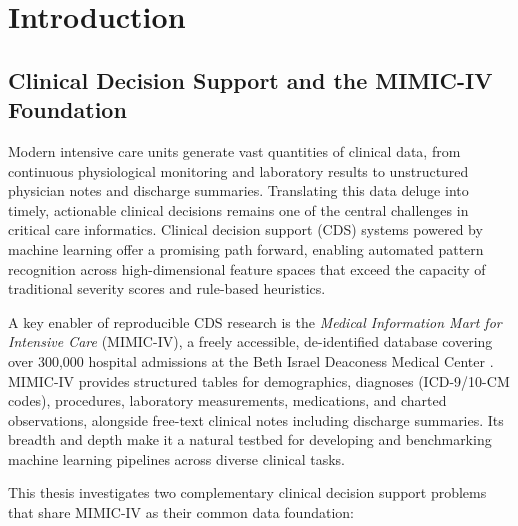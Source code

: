 \chapter{Introduction} \label{chap:intro}

\section{Clinical Decision Support and the MIMIC-IV Foundation}
\label{sec:cds_mimic_foundation}

Modern intensive care units generate vast quantities of clinical data, from continuous physiological monitoring and laboratory results to unstructured physician notes and discharge summaries. Translating this data deluge into timely, actionable clinical decisions remains one of the central challenges in critical care informatics. Clinical decision support (CDS) systems powered by machine learning offer a promising path forward, enabling automated pattern recognition across high-dimensional feature spaces that exceed the capacity of traditional severity scores and rule-based heuristics.

A key enabler of reproducible CDS research is the \emph{Medical Information Mart for Intensive Care} (MIMIC-IV), a freely accessible, de-identified database covering over 300,000 hospital admissions at the Beth Israel Deaconess Medical Center \citep{Johnson_2023_MIMIC,johnson2023mimicivscidata}. MIMIC-IV provides structured tables for demographics, diagnoses (ICD-9/10-CM codes), procedures, laboratory measurements, medications, and charted observations, alongside free-text clinical notes including discharge summaries. Its breadth and depth make it a natural testbed for developing and benchmarking machine learning pipelines across diverse clinical tasks.

This thesis investigates two complementary clinical decision support problems that share MIMIC-IV as their common data foundation:


